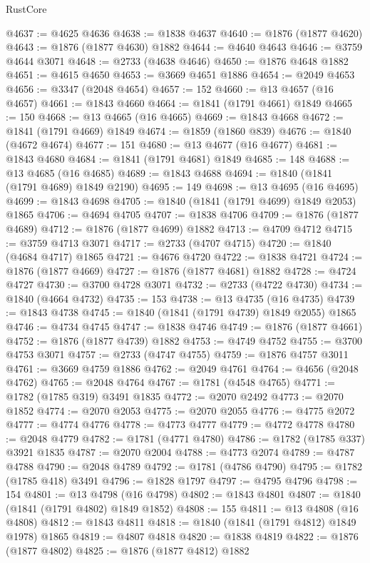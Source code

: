 \begin{lexlean}{RustCore}
\begin{coremodule}
@4637 := @4625 @4636
@4638 := @1838 @4637
@4640 := @1876 (@1877 @4620)
@4643 := @1876 (@1877 @4630) @1882
@4644 := @4640 @4643
@4646 := @3759 @4644 @3071
@4648 := @2733 (@4638 @4646)
@4650 := @1876 @4648 @1882
@4651 := @4615 @4650
@4653 := @3669 @4651 @1886
@4654 := @2049 @4653
@4656 := @3347 (@2048 @4654)
@4657 := 152
@4660 := @13 @4657 (@16 @4657)
@4661 := @1843 @4660
@4664 := @1841 (@1791 @4661) @1849
@4665 := 150
@4668 := @13 @4665 (@16 @4665)
@4669 := @1843 @4668
@4672 := @1841 (@1791 @4669) @1849
@4674 := @1859 (@1860 @839)
@4676 := @1840 (@4672 @4674)
@4677 := 151
@4680 := @13 @4677 (@16 @4677)
@4681 := @1843 @4680
@4684 := @1841 (@1791 @4681) @1849
@4685 := 148
@4688 := @13 @4685 (@16 @4685)
@4689 := @1843 @4688
@4694 := @1840 (@1841 (@1791 @4689) @1849 @2190)
@4695 := 149
@4698 := @13 @4695 (@16 @4695)
@4699 := @1843 @4698
@4705 := @1840 (@1841 (@1791 @4699) @1849 @2053) @1865
@4706 := @4694 @4705
@4707 := @1838 @4706
@4709 := @1876 (@1877 @4689)
@4712 := @1876 (@1877 @4699) @1882
@4713 := @4709 @4712
@4715 := @3759 @4713 @3071
@4717 := @2733 (@4707 @4715)
@4720 := @1840 (@4684 @4717) @1865
@4721 := @4676 @4720
@4722 := @1838 @4721
@4724 := @1876 (@1877 @4669)
@4727 := @1876 (@1877 @4681) @1882
@4728 := @4724 @4727
@4730 := @3700 @4728 @3071
@4732 := @2733 (@4722 @4730)
@4734 := @1840 (@4664 @4732)
@4735 := 153
@4738 := @13 @4735 (@16 @4735)
@4739 := @1843 @4738
@4745 := @1840 (@1841 (@1791 @4739) @1849 @2055) @1865
@4746 := @4734 @4745
@4747 := @1838 @4746
@4749 := @1876 (@1877 @4661)
@4752 := @1876 (@1877 @4739) @1882
@4753 := @4749 @4752
@4755 := @3700 @4753 @3071
@4757 := @2733 (@4747 @4755)
@4759 := @1876 @4757 @3011
@4761 := @3669 @4759 @1886
@4762 := @2049 @4761
@4764 := @4656 (@2048 @4762)
@4765 := @2048 @4764
@4767 := @1781 (@4548 @4765)
@4771 := @1782 (@1785 @319) @3491 @1835
@4772 := @2070 @2492
@4773 := @2070 @1852
@4774 := @2070 @2053
@4775 := @2070 @2055
@4776 := @4775 @2072
@4777 := @4774 @4776
@4778 := @4773 @4777
@4779 := @4772 @4778
@4780 := @2048 @4779
@4782 := @1781 (@4771 @4780)
@4786 := @1782 (@1785 @337) @3921 @1835
@4787 := @2070 @2004
@4788 := @4773 @2074
@4789 := @4787 @4788
@4790 := @2048 @4789
@4792 := @1781 (@4786 @4790)
@4795 := @1782 (@1785 @418) @3491
@4796 := @1828 @1797
@4797 := @4795 @4796
@4798 := 154
@4801 := @13 @4798 (@16 @4798)
@4802 := @1843 @4801
@4807 := @1840 (@1841 (@1791 @4802) @1849 @1852)
@4808 := 155
@4811 := @13 @4808 (@16 @4808)
@4812 := @1843 @4811
@4818 := @1840 (@1841 (@1791 @4812) @1849 @1978) @1865
@4819 := @4807 @4818
@4820 := @1838 @4819
@4822 := @1876 (@1877 @4802)
@4825 := @1876 (@1877 @4812) @1882

\end{coremodule}
\end{lexlean}
